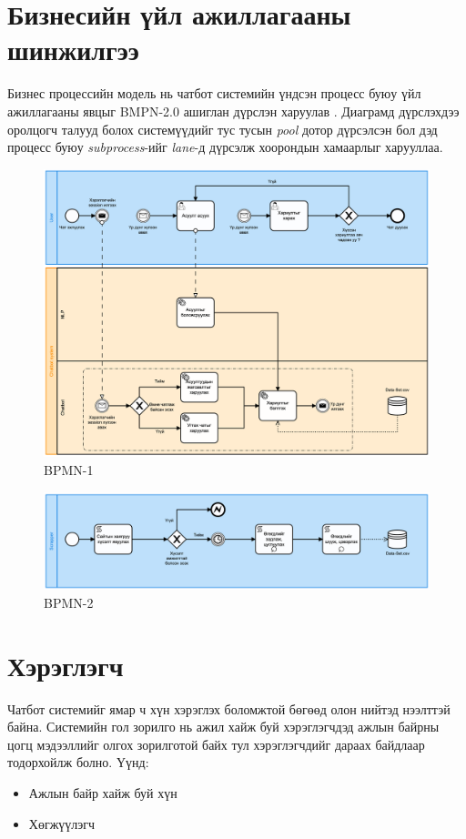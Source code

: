 \section{Бизнесийн үйл ажиллагааны шинжилгээ}
Бизнес процессийн модель нь чатбот системийн үндсэн процесс буюу үйл ажиллагааны явцыг BMPN-2.0 ашиглан дүрслэн харуулав \cite{BPMN}. Диаграмд дүрслэхдээ оролцогч талууд болох системүүдийг тус тусын \textit{pool} дотор дүрсэлсэн бол дэд процесс буюу \textit{subprocess}-ийг \textit{lane}-д дүрсэлж хоорондын хамаарлыг харууллаа. 
\begin{figure}[ht]
  \centering
  \includegraphics[width=\textwidth]{images/bpmn1.png}
  \caption{BPMN-1}\label{fig:bpmn1}
\end{figure}
\begin{figure}[ht]
\centering
\includegraphics[width=\textwidth]{images/bpmn2.png}
\caption{BPMN-2}\label{fig:bpmn2}
\end{figure}
\section{Хэрэглэгч}
Чатбот системийг ямар ч хүн хэрэглэх боломжтой бөгөөд олон нийтэд нээлттэй байна. Системийн гол зорилго нь ажил хайж буй хэрэглэгчдэд ажлын байрны цогц мэдээллийг олгох зорилготой байх тул хэрэглэгчдийг дараах байдлаар тодорхойлж болно. Үүнд:
\begin{itemize}
  \item Ажлын байр хайж буй хүн
  \item Хөгжүүлэгч
\end{itemize}
